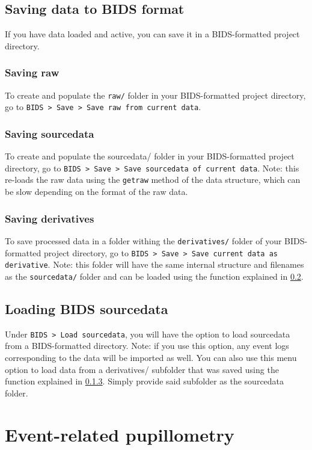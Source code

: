 \documentclass{article}
\begin{document}
\subsection{Saving data to BIDS format}
If you have data loaded and active, you can save it in a BIDS-formatted project directory.
\subsubsection{Saving raw}
To create and populate the \texttt{raw/} folder in your BIDS-formatted project directory, go to \texttt{BIDS > Save > Save raw from current data}.
\subsubsection{Saving sourcedata}
To create and populate the sourcedata/ folder in your BIDS-formatted project directory, go to \texttt{BIDS > Save > Save sourcedata of current data}. Note: this re-loads the raw data using the \texttt{getraw} method of the data structure, which can be slow depending on the format of the raw data.
\subsubsection{Saving derivatives} \label{saving_derivatives}
To save processed data in a folder withing the \texttt{derivatives/} folder of your BIDS-formatted project directory, go to \texttt{BIDS > Save > Save current data as derivative}. Note: this folder will have the same internal structure and filenames as the \texttt{sourcedata/} folder and can be loaded using the function explained in \ref{load_sourcedata}.
\subsection{Loading BIDS sourcedata} \label{load_sourcedata}
Under \texttt{BIDS > Load sourcedata}, you will have the option to load sourcedata from a BIDS-formatted directory. Note: if you use this option, any event logs corresponding to the data will be imported as well. You can also use this menu option to load data from a derivatives/ subfolder that was saved using the function explained in \ref{saving_derivatives}. Simply provide said subfolder as the sourcedata folder.
\section{Event-related pupillometry}
\end{document}
